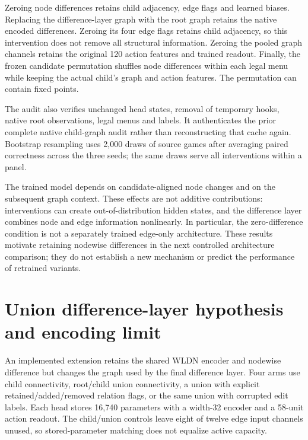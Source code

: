 

Zeroing node differences retains child adjacency, edge flags and learned
biases. Replacing the difference-layer graph with the root graph retains the
native encoded differences. Zeroing its four edge flags retains child
adjacency, so this intervention does not remove all structural information.
Zeroing the pooled graph channels retains the original 120 action features
and trained readout. Finally, the frozen candidate permutation shuffles node
differences within each legal menu while keeping the actual child's graph and
action features. The permutation can contain fixed points.

\WLDNInterventionResult{}
The audit also verifies unchanged head states, removal of temporary hooks,
native root observations, legal menus and labels. It authenticates the prior
complete native child-graph audit rather than reconstructing that cache again.
Bootstrap resampling uses 2,000 draws of source games after averaging paired
correctness across the three seeds; the same draws serve all interventions
within a panel.

The trained model depends on candidate-aligned node changes and on the
subsequent graph context. These effects are not additive contributions:
interventions can create out-of-distribution hidden states, and the difference
layer combines node and edge information nonlinearly. In particular, the
zero-difference condition is not a separately trained edge-only architecture.
These results motivate retaining nodewise differences in the next controlled
architecture comparison; they do not establish a new mechanism or predict the
performance of retrained variants.

\FloatBarrier
\section{Union difference-layer hypothesis and encoding limit}
\label{app:union-basis}
An implemented extension retains the shared WLDN encoder \citep{jin2017} and nodewise
difference but changes the graph used by the final difference layer. Four arms
use child connectivity, root/child union connectivity, a union with explicit
retained/added/removed relation flags, or the same union with corrupted edit
labels. Each head stores 16,740 parameters with a width-32 encoder and a
58-unit action readout. The child/union controls leave eight of twelve edge
input channels unused, so stored-parameter matching does not equalize active
capacity. \UnionDifferenceEngineering{}


